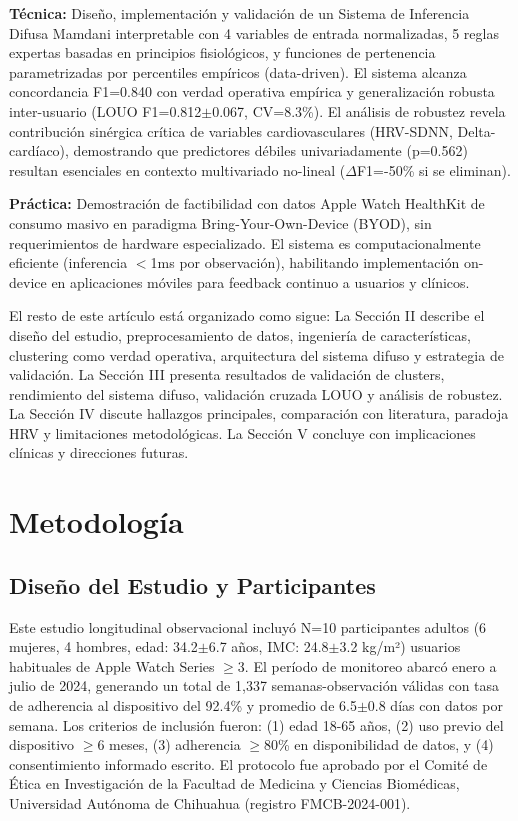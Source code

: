 \documentclass[journal,twoside,web]{ieeecolor}
\begin{document}
\textbf{Técnica:} Diseño, implementación y validación de un Sistema de Inferencia Difusa Mamdani interpretable con 4 variables de entrada normalizadas, 5 reglas expertas basadas en principios fisiológicos, y funciones de pertenencia parametrizadas por percentiles empíricos (data-driven). El sistema alcanza concordancia F1=0.840 con verdad operativa empírica y generalización robusta inter-usuario (LOUO F1=0.812$\pm$0.067, CV=8.3\%). El análisis de robustez revela contribución sinérgica crítica de variables cardiovasculares (HRV-SDNN, Delta-cardíaco), demostrando que predictores débiles univariadamente (p=0.562) resultan esenciales en contexto multivariado no-lineal ($\Delta$F1=-50\% si se eliminan).

\textbf{Práctica:} Demostración de factibilidad con datos Apple Watch HealthKit de consumo masivo en paradigma Bring-Your-Own-Device (BYOD), sin requerimientos de hardware especializado. El sistema es computacionalmente eficiente (inferencia $<$1ms por observación), habilitando implementación on-device en aplicaciones móviles para feedback continuo a usuarios y clínicos.

El resto de este artículo está organizado como sigue: La Sección II describe el diseño del estudio, preprocesamiento de datos, ingeniería de características, clustering como verdad operativa, arquitectura del sistema difuso y estrategia de validación. La Sección III presenta resultados de validación de clusters, rendimiento del sistema difuso, validación cruzada LOUO y análisis de robustez. La Sección IV discute hallazgos principales, comparación con literatura, paradoja HRV y limitaciones metodológicas. La Sección V concluye con implicaciones clínicas y direcciones futuras.


\section{Metodología}

\subsection{Diseño del Estudio y Participantes}
Este estudio longitudinal observacional incluyó N=10 participantes adultos (6 mujeres, 4 hombres, edad: 34.2$\pm$6.7 años, IMC: 24.8$\pm$3.2 kg/m²) usuarios habituales de Apple Watch Series $\geq$3. El período de monitoreo abarcó enero a julio de 2024, generando un total de 1,337 semanas-observación válidas con tasa de adherencia al dispositivo del 92.4\% y promedio de 6.5$\pm$0.8 días con datos por semana. Los criterios de inclusión fueron: (1) edad 18-65 años, (2) uso previo del dispositivo $\geq$6 meses, (3) adherencia $\geq$80\% en disponibilidad de datos, y (4) consentimiento informado escrito. El protocolo fue aprobado por el Comité de Ética en Investigación de la Facultad de Medicina y Ciencias Biomédicas, Universidad Autónoma de Chihuahua (registro FMCB-2024-001).
\end{document}

